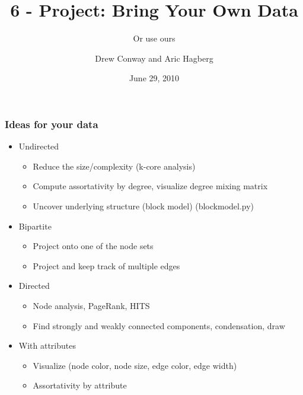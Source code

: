 \documentclass[xcolor=dvipsnames, 9pt]{beamer}
\title{6 - Project: Bring Your Own Data}
\subtitle{Or use ours}
\author{Drew Conway and Aric Hagberg}
\date{June 29, 2010}
\begin{document}
\begin{frame}[plain]
\titlepage
\end{frame}

\begin{frame}
\frametitle{Ideas for your data}
    \begin{itemize}
      \item Undirected
        \begin{itemize}
        \item Reduce the size/complexity (k-core analysis)
        \item Compute assortativity by degree, visualize degree mixing matrix
         \item Uncover underlying structure (block model) (blockmodel.py)
      \end{itemize}
      \item Bipartite
        \begin{itemize}
          \item Project onto one of the node sets
          \item Project and keep track of multiple edges 
         \end{itemize}
      \item Directed
      \begin{itemize}
         \item Node analysis, PageRank, HITS
         \item Find strongly and weakly connected components, condensation, draw
      \end{itemize}
      \item With attributes 
        \begin{itemize}
        \item Visualize (node color, node size, edge color, edge width)
        \item Assortativity by attribute
       \end{itemize}
    \end{itemize}
\end{frame}


\end{document}
